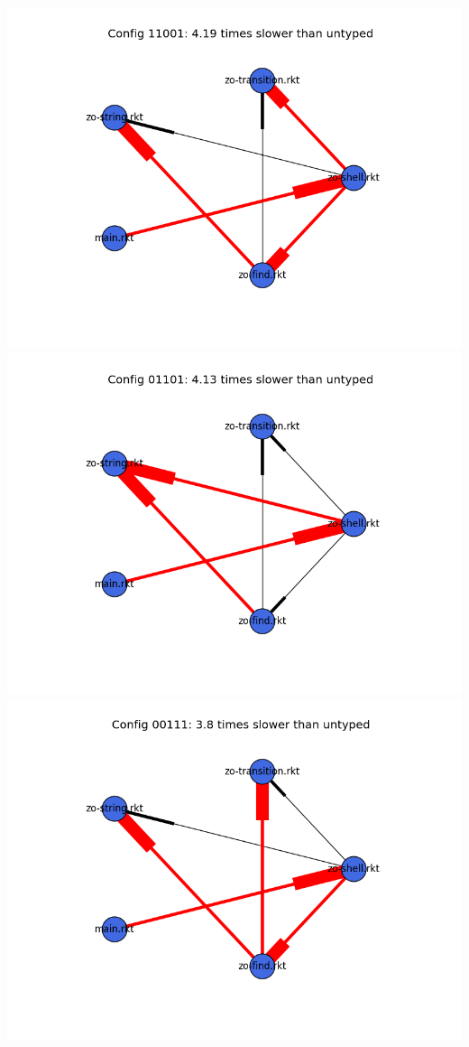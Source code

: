 \documentclass{article}
\begin{document}
\begin{itemize}
\includegraphics[width=\textwidth]{zordoz-2015-04-09-module-graph-11001.png}
\includegraphics[width=\textwidth]{zordoz-2015-04-09-module-graph-01101.png}
\includegraphics[width=\textwidth]{zordoz-2015-04-09-module-graph-00111.png}
\end{itemize}
\end{document}

